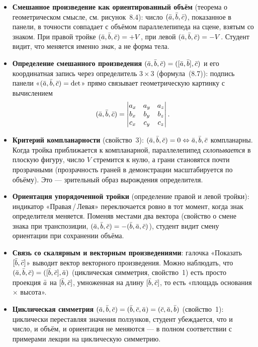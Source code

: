 \begin{itemize}
  \item \textbf{Смешанное произведение как ориентированный объём}
    (теорема о геометрическом смысле, см. рисунок~8.4): число $(\bar{a},\bar{b},\bar{c})$,
    показанное в панели, в точности совпадает с объёмом параллелепипеда на
    сцене, взятым со знаком. При правой тройке $(\bar{a},\bar{b},\bar{c})=+V$, при левой
    $(\bar{a},\bar{b},\bar{c})=-V$. Студент видит, что меняется именно \emph{знак}, а не
    форма тела.
  \item \textbf{Определение смешанного произведения}
    $(\bar{a},\bar{b},\bar{c})=([\bar{a},\bar{b}],\bar{c})$ и его координатная запись через
    определитель $3\times3$ (формула~(8.7)): подпись панели «$(\bar{a},\bar{b},\bar{c})=
    \det$» прямо связывает геометрическую картинку с вычислением
    \[
      (\bar{a},\bar{b},\bar{c})=
      \begin{vmatrix}
        a_x & a_y & a_z \\
        b_x & b_y & b_z \\
        c_x & c_y & c_z
      \end{vmatrix}.
    \]
  \item \textbf{Критерий компланарности} (свойство~3):
    $(\bar{a},\bar{b},\bar{c})=0 \Leftrightarrow \bar{a},\bar{b},\bar{c}$ компланарны. Когда тройка
    приближается к компланарной, параллелепипед \emph{схлопывается} в плоскую
    фигуру, число $V$ стремится к нулю, а грани становятся почти прозрачными
    (прозрачность граней в демонстрации масштабируется по объёму). Это —
    зрительный образ вырождения определителя.
  \item \textbf{Ориентация упорядоченной тройки} (определение правой и левой
    тройки): индикатор «Правая\,/\,Левая» переключается ровно в тот момент,
    когда знак определителя меняется. Поменяв местами два вектора
    (свойство о смене знака при транспозиции, $(\bar{a},\bar{b},\bar{c})=-(\bar{b},\bar{a},\bar{c})$),
    студент видит смену ориентации при сохранении объёма.
  \item \textbf{Связь со скалярным и векторным произведениями}: галочка
    «Показать $[\bar{b},\bar{c}]$» выводит вектор векторного произведения. Можно
    наблюдать, что $(\bar{a},\bar{b},\bar{c})=([\bar{b},\bar{c}],\bar{a})$ (циклическая симметрия,
    свойство~1) есть просто проекция $\bar{a}$ на $[\bar{b},\bar{c}]$, умноженная на длину
    $[\bar{b},\bar{c}]$, то есть «площадь основания $\times$ высота».
  \item \textbf{Циклическая симметрия} $(\bar{a},\bar{b},\bar{c})=(\bar{b},\bar{c},\bar{a})=
    (\bar{c},\bar{a},\bar{b})$ (свойство~1): циклически переставляя значения ползунков,
    студент убеждается, что и число, и объём, и ориентация не меняются —
    в полном соответствии с примерами лекции на циклическую симметрию.
\end{itemize}

